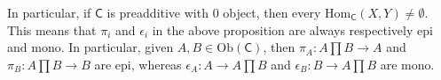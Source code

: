 \begin{cor}
	In particular, if $\mathsf{C}$ is preadditive with $0$ object, then every $\mathrm{Hom}_{\mathsf{C}} \left( X, Y \right) \neq \emptyset$.
	This means that $\pi_i$ and $\epsilon_i$ in the above proposition are always respectively epi and mono.
	In particular, given $A, B \in \mathrm{Ob} \left(\mathsf{C}\right)$, then 
	$\pi_A: A \prod B \to A$ and $\pi_B: A \prod B \to B$ are epi, whereas
	$\epsilon_A: A \to A \prod B$ and $\epsilon_B: B \to A \prod B$ are mono.
\end{cor} 

